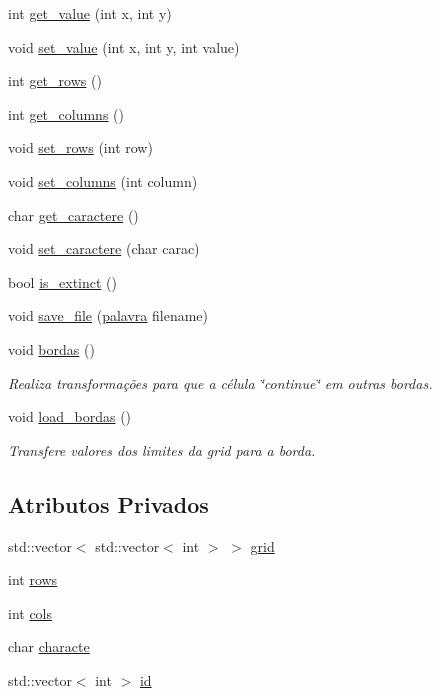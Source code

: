 \begin{DoxyCompactItemize}
int \hyperlink{classLife_a84991971ca97509cc769ad527f010585}{get\+\_\+value} (int x, int y)
\item 
void \hyperlink{classLife_a9c560e37d0fdf23e908f5f6e2caf9eab}{set\+\_\+value} (int x, int y, int value)
\item 
int \hyperlink{classLife_ae4a3608385b8435f55102c89363d6e26}{get\+\_\+rows} ()
\item 
int \hyperlink{classLife_ac82f1ba83db36b3142ec12c2fc334de3}{get\+\_\+columns} ()
\item 
void \hyperlink{classLife_a2a76d59604c348b77e49af72a099ba31}{set\+\_\+rows} (int row)
\item 
void \hyperlink{classLife_a62931743c6915fecee04b7a613d724be}{set\+\_\+columns} (int column)
\item 
char \hyperlink{classLife_a21ada75e45a4a244eeab403fb34534fe}{get\+\_\+caractere} ()
\item 
void \hyperlink{classLife_ad24dcdaa235aca6216718cd69e346730}{set\+\_\+caractere} (char carac)
\item 
bool \hyperlink{classLife_a7b7cd244c2ce5b7d6ed0db9a188b2256}{is\+\_\+extinct} ()
\item 
void \hyperlink{classLife_a11daef20ad2196b79e3f944f701d8438}{save\+\_\+file} (\hyperlink{main_8cpp_a7245fe4f29fbfabfc60878ac7b3ccc0c}{palavra} filename)
\item 
void \hyperlink{classLife_a80aac6b6b00f8cf0589207953f3f844b}{bordas} ()
\begin{DoxyCompactList}\small\item\em Realiza transformações para que a célula \char`\"{}continue\char`\"{} em outras bordas. \end{DoxyCompactList}\item 
void \hyperlink{classLife_a8cc497d4d07aa0d9b6b31faa14f0e12f}{load\+\_\+bordas} ()
\begin{DoxyCompactList}\small\item\em Transfere valores dos limites da grid para a borda. \end{DoxyCompactList}\end{DoxyCompactItemize}
\subsection*{Atributos Privados}
\begin{DoxyCompactItemize}
\item 
std\+::vector$<$ std\+::vector$<$ int $>$ $>$ \hyperlink{classLife_aeec163723c0c9aa1bc01483cd790210d}{grid}
\item 
int \hyperlink{classLife_ab4d1ea4344ba31a4686f388edb7e2927}{rows}
\item 
int \hyperlink{classLife_a31a428734f7dc76ca386963139699ac6}{cols}
\item 
char \hyperlink{classLife_aaf37ed012cf57294435f190da1bf4d1c}{characte}
\item 
std\+::vector$<$ int $>$ \hyperlink{classLife_ab33d6ee162673a71742a3df07a0a2e2f}{id}
\end{DoxyCompactItemize}


